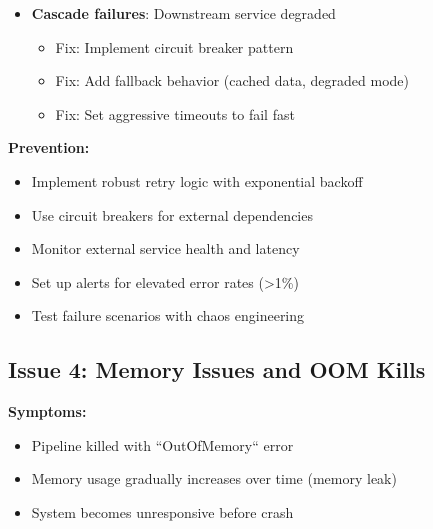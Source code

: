 \begin{enumerate}
\begin{itemize}
            \item \textbf{Cascade failures}: Downstream service degraded
                \begin{itemize}
                    \item Fix: Implement circuit breaker pattern
                    \item Fix: Add fallback behavior (cached data, degraded mode)
                    \item Fix: Set aggressive timeouts to fail fast
                \end{itemize}
        \end{itemize}
\end{enumerate}

\textbf{Prevention:}
\begin{itemize}
    \item Implement robust retry logic with exponential backoff
    \item Use circuit breakers for external dependencies
    \item Monitor external service health and latency
    \item Set up alerts for elevated error rates (>1\%)
    \item Test failure scenarios with chaos engineering
\end{itemize}

\subsection{Issue 4: Memory Issues and OOM Kills}

\textbf{Symptoms:}
\begin{itemize}
    \item Pipeline killed with ``OutOfMemory`` error
    \item Memory usage gradually increases over time (memory leak)
    \item System becomes unresponsive before crash
\end{itemize}

